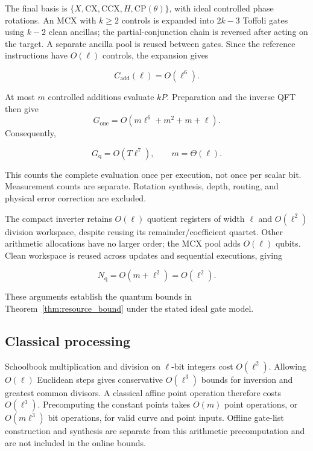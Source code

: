 \begin{revision}
The final basis is $\{X,\mathrm{CX},\mathrm{CCX},H,\mathrm{CP}(\theta)\}$, with ideal controlled phase rotations. An MCX with $k\geq2$ controls is expanded into $2k-3$ Toffoli gates using $k-2$ clean ancillas; the partial-conjunction chain is reversed after acting on the target. A separate ancilla pool is reused between gates. Since the reference instructions have $O(\ell)$ controls, the expansion gives

\begin{equation}
    \label{eq:app_r6_addition_bound}
    C_{\mathrm{add}}(\ell)=O(\ell^6).
\end{equation}

At most $m$ controlled additions evaluate $kP$. Preparation and the inverse QFT then give 
\[
    G_{\mathrm{one}}=O(m\ell^6+m^2+m+\ell).
\]
Consequently, 

\begin{equation}
    \label{eq:app_r6_quantum_total}
    G_{\mathrm q}=O(T\ell^7),\qquad m=\Theta(\ell).
\end{equation}

This counts the complete evaluation once per execution, not once per scalar bit. Measurement counts are separate. Rotation synthesis, depth, routing, and physical error correction are excluded. 

The compact inverter retains $O(\ell)$ quotient registers of width $\ell$ and $O(\ell^2)$ division workspace, despite reusing its remainder/coefficient quartet. Other arithmetic allocations have no larger order; the MCX pool adds $O(\ell)$ qubits. Clean workspace is reused across updates and sequential executions, giving 

\begin{equation}
    \label{eq:app_r6_workspace}
    N_{\mathrm q}=O(m+\ell^2)=O(\ell^2).
\end{equation}

These arguments establish the quantum bounds in Theorem~\ref{thm:resource_bound} under the stated ideal gate model.

\subsection{Classical processing}

Schoolbook multiplication and division on $\ell$-bit integers cost $O(\ell^2)$. Allowing $O(\ell)$ Euclidean steps gives conservative $O(\ell^3)$ bounds for inversion and greatest common divisors. A classical affine point operation therefore costs $O(\ell^3)$. Precomputing the constant points takes $O(m)$ point operations, or $O(m\ell^3)$ bit operations, for valid curve and point inputs. Offline gate-list construction and synthesis are separate from this arithmetic precomputation and are not included in the online bounds.


\end{revision}
